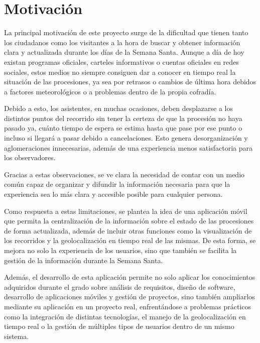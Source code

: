 \section{Motivación}\label{cap:motivacion}

La principal motivación de este proyecto surge de la dificultad que tienen tanto los ciudadanos como los visitantes a la hora de buscar y obtener información clara y actualizada durante los días de la Semana Santa. Aunque a día de hoy existan programas oficiales, carteles informativos o cuentas oficiales en redes sociales, estos medios no siempre consiguen dar a conocer en tiempo real la situación de las procesiones, ya sea por retrasos o cambios de última hora debidos a factores meteorológicos o a problemas dentro de la propia cofradía.

Debido a esto, los asistentes, en muchas ocasiones, deben desplazarse a los distintos puntos del recorrido sin tener la certeza de que la procesión no haya pasado ya, cuánto tiempo de espera se estima hasta que pase por ese punto o incluso si llegará a pasar debido a cancelaciones. Esto genera desorganización y aglomeraciones innecesarias, además de una experiencia menos satisfactoria para los observadores.

Gracias a estas observaciones, se ve clara la necesidad de contar con un medio común capaz de organizar y difundir la información necesaria para que la experiencia sea lo más clara y accesible posible para cualquier persona.

Como respuesta a estas limitaciones, se plantea la idea de una aplicación móvil que permita la centralización de la información sobre el estado de las procesiones de forma actualizada, además de incluir otras funciones como la visualización de los recorridos y la geolocalización en tiempo real de las mismas. De esta forma, se mejora no solo la experiencia de los usuarios, sino que también se facilita la gestión de la información durante la Semana Santa.

Además, el desarrollo de esta aplicación permite no solo aplicar los conocimientos adquiridos durante el grado sobre análisis de requisitos, diseño de software, desarrollo de aplicaciones móviles y gestión de proyectos, sino también ampliarlos mediante su aplicación en un proyecto real, enfrentándose a problemas prácticos como la integración de distintas tecnologías, el manejo de la geolocalización en tiempo real o la gestión de múltiples tipos de usuarios dentro de un mismo sistema.
